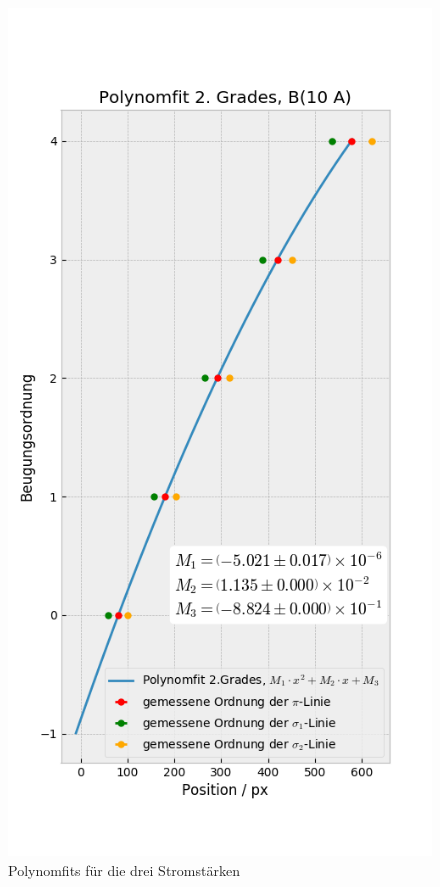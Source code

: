         \begin{landscape}
          \thispagestyle{empty}
          \begin{figure}
            \vspace*{-2cm}
            \caption{Polynomfits für die drei Stromstärken}
            \hspace*{-5cm}
            \includegraphics[width=.45\paperwidth]{Auswertung/scatterorder/sco_10A}

\end{figure}
\end{landscape}

